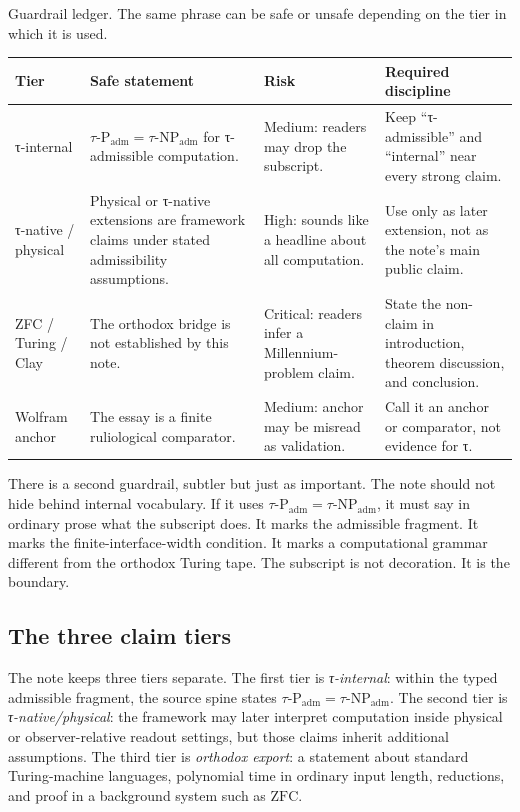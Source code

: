 \documentclass{pantarhei-researchnote}
\newcommand{\Padm}{\ensuremath{\tau\text{-}\mathrm{P}_{\mathrm{adm}}}}
\newcommand{\NPadm}{\ensuremath{\tau\text{-}\mathrm{NP}_{\mathrm{adm}}}}
\newcommand{\ZFC}{\ensuremath{\mathrm{ZFC}}}
\begin{document}
\begin{widetable}[t]
\caption{Guardrail ledger. The same phrase can be safe or unsafe depending
on the tier in which it is used.}
\label{tab:guardrails}
\prtablefont
\begin{tabularx}{\textwidth}{p{}Y Y Y}
\toprule
\textbf{Tier} & \textbf{Safe statement} & \textbf{Risk} & \textbf{Required discipline} \\
\midrule
τ-internal & \(\Padm=\NPadm\) for τ-admissible computation. & Medium:
readers may drop the subscript. & Keep ``τ-admissible'' and ``internal''
near every strong claim. \\
τ-native / physical & Physical or τ-native extensions are framework
claims under stated admissibility assumptions. & High: sounds like a
headline about all computation. & Use only as later extension, not as
the note's main public claim. \\
ZFC / Turing / Clay & The orthodox bridge is not established by this
note. & Critical: readers infer a Millennium-problem claim. & State the
non-claim in introduction, theorem discussion, and conclusion. \\
Wolfram anchor & The essay is a finite ruliological comparator. & Medium:
anchor may be misread as validation. & Call it an anchor or comparator,
not evidence for τ. \\
\bottomrule
\end{tabularx}
\end{widetable}

There is a second guardrail, subtler but just as important. The note should
not hide behind internal vocabulary. If it uses \(\Padm=\NPadm\), it must
say in ordinary prose what the subscript does. It marks the admissible
fragment. It marks the finite-interface-width condition. It marks a
computational grammar different from the orthodox Turing tape. The
subscript is not decoration. It is the boundary.

\subsection{The three claim tiers}

The note keeps three tiers separate. The first tier is
\emph{τ-internal}: within the typed admissible fragment, the source spine
states \(\Padm=\NPadm\). The second tier is
\emph{τ-native/physical}: the framework may later interpret computation
inside physical or observer-relative readout settings, but those claims
inherit additional assumptions. The third tier is \emph{orthodox export}:
a statement about standard Turing-machine languages, polynomial time in
ordinary input length, reductions, and proof in a background system such
as \ZFC.
\end{document}
